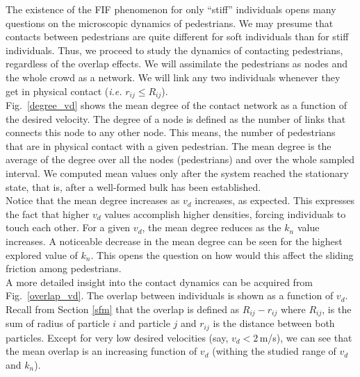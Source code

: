 \documentclass[preprint,12pt]{elsarticle}
\begin{document}
The existence of the FIF phenomenon for only ``stiff'' individuals opens many questions 
on the microscopic dynamics of pedestrians. We may presume that contacts 
between pedestrians are quite different for soft individuals than for stiff 
individuals. Thus, we proceed to study the dynamics of contacting pedestrians, regardless of the overlap 
effects. We will assimilate the pedestrians as nodes and the whole crowd as a 
network. We will link any two individuals whenever they get in physical 
contact (\textit{i.e.} $r_{ij} \leq R_{ij}$).\\

Fig.~\ref{degree_vd} shows the mean degree of the contact network as a function  
of the desired velocity. The degree of a node is defined as the number of links 
that connects this node to any other node. This means, the number of pedestrians 
that are in physical contact with a given pedestrian. The mean degree is the 
average of the degree over all the nodes (pedestrians) and over the whole 
sampled interval. We computed mean values only after the system reached the stationary 
state, that is, after a well-formed bulk has been established.\\

Notice that the mean degree increases as $v_d$ increases, as expected. This expresses the fact that
higher $v_d$ values accomplish higher densities, forcing individuals to touch each 
other. For a given $v_d$, the mean degree reduces as the $k_n$ 
value increases. A noticeable decrease in the mean degree can be seen for the 
highest explored value of $k_n$. This opens the question on how would
this affect the sliding friction among pedestrians.\\

A more detailed insight into the contact dynamics can be acquired from 
Fig.~\ref{overlap_vd}. The overlap between individuals is shown as a function of 
$v_d$. Recall from Section \ref{sfm} that the overlap is defined as 
$R_{ij}-r_{ij}$ where $R_{ij}$, is the sum of radius of particle $i$ and 
particle $j$ and $r_{ij}$  is the distance between both particles. Except for 
very low desired velocities (say, $v_d<2\,$m/s), we can see that the mean 
overlap is an increasing function of $v_d$ (withing the studied
range of $v_d$ and $k_n$).\\
\end{document}

